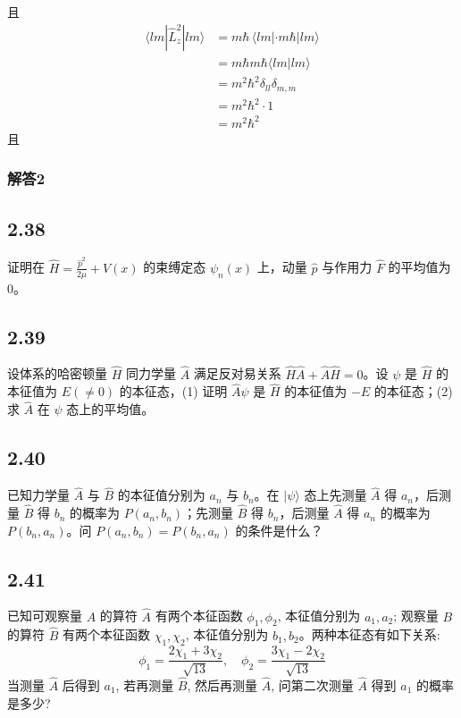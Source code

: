 且
\begin{equation}
    \begin{aligned}
        \langle lm|\hat{L}_{z}^{2}|lm\rangle &=m\hbar \,\langle lm|\cdot m\hbar |lm\rangle 
\\
&=m\hbar m\hbar \langle lm|lm\rangle 
\\
&=m^2\hbar ^2\delta _{ll}\delta _{m,m}
\\
&=m^2\hbar ^2\cdot 1
\\
&=m^2\hbar ^2
    \end{aligned}
\end{equation}
且


\subsubsection{解答2}


\newpage
\subsection{2.38}
证明在 $\hat{H} = \frac{\hat{p}^2}{2\mu} + V(x)$ 的束缚定态 $\psi_n (x)$ 上，动量 $\hat{p}$ 与作用力 $\hat{F}$ 的平均值为0。

\subsection{2.39}
设体系的哈密顿量 $\hat{H}$ 同力学量 $\hat{A}$ 满足反对易关系 $\hat{H} \hat{A} + \hat{A} \hat{H} = 0$。设 $\psi$ 是 $\hat{H}$ 的本征值为 $E(\neq 0)$ 的本征态，(1) 证明 $\hat{A} \psi$ 是 $\hat{H}$ 的本征值为 $-E$ 的本征态；(2) 求 $\hat{A}$ 在 $\psi$ 态上的平均值。

\subsection{2.40}
已知力学量 $\hat{A}$ 与 $\hat{B}$ 的本征值分别为 $a_n$ 与 $b_n$。在 $|\psi\rangle$ 态上先测量 $\hat{A}$ 得 $a_n$，后测量 $\hat{B}$ 得 $b_n$ 的概率为 $P(a_n, b_n)$；先测量 $\hat{B}$ 得 $b_n$，后测量 $\hat{A}$ 得 $a_n$ 的概率为 $P(b_n, a_n)$。问 $P(a_n, b_n) = P(b_n, a_n)$ 的条件是什么？

\subsection{2.41}
已知可观察量 $A$ 的算符 $\hat{A}$ 有两个本征函数 $\phi_1, \phi_2$, 本征值分别为 $a_1, a_2$; 观察量 $B$ 的算符 $\hat{B}$ 有两个本征函数 $\chi_1, \chi_2$, 本征值分别为 $b_1, b_2$。两种本征态有如下关系:
$$\phi_1 = \frac{2\chi_1 + 3\chi_2}{\sqrt{13}}, \quad \phi_2 = \frac{3\chi_1 - 2\chi_2}{\sqrt{13}}$$
当测量 $\hat{A}$ 后得到 $a_1$, 若再测量 $\hat{B}$, 然后再测量 $\hat{A}$, 问第二次测量 $\hat{A}$ 得到 $a_1$ 的概率是多少?

